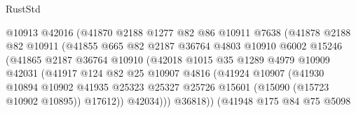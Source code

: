 \begin{lexlean}{RustStd}
\begin{coremodule}
                              @10913
                              @42016
                              (@41870
                                @2188
                                @1277
                                @82
                                @86
                                @10911
                                @7638
                                (@41878
                                  @2188
                                  @82
                                  @10911
                                  (@41855
                                    @665
                                    @82
                                    @2187
                                    @36764
                                    @4803
                                    @10910
                                    @6002
                                    @15246
                                    (@41865
                                      @2187
                                      @36764
                                      @10910
                                      (@42018
                                        @1015
                                        @35
                                        @1289
                                        @4979
                                        @10909
                                        @42031
                                        (@41917
                                          @124
                                          @82
                                          @25
                                          @10907
                                          @4816
                                          (@41924
                                            @10907
                                            (@41930
                                              @10894
                                              @10902
                                              @41935
                                              @25323
                                              @25327
                                              @25726
                                              @15601
                                              (@15090 (@15723 @10902 @10895))
                                              @17612))
                                          @42034)))
                                    @36818))
                                (@41948
                                  @175
                                  @84
                                  @75
                                  @5098

\end{coremodule}
\end{lexlean}
